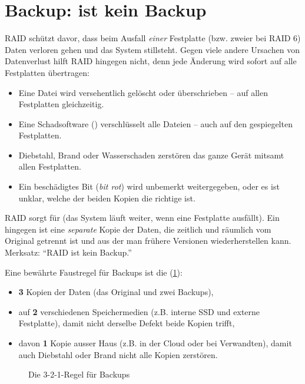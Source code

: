 \section{Backup:  ist kein Backup}\label{sec:backup}

\gls{RAID} schützt davor, dass beim Ausfall \textit{einer} Festplatte (bzw. zweier bei \gls{RAID} 6) Daten verloren gehen und das System stillsteht. Gegen viele andere Ursachen von Datenverlust hilft \gls{RAID} hingegen nicht, denn jede Änderung wird sofort auf alle Festplatten übertragen:
\begin{itemize}
    \item Eine Datei wird versehentlich gelöscht oder überschrieben -- auf allen Festplatten gleichzeitig.
    \item Eine Schadsoftware () verschlüsselt alle Dateien -- auch auf den gespiegelten Festplatten.
    \item Diebstahl, Brand oder Wasserschaden zerstören das ganze Gerät mitsamt allen Festplatten.
    \item Ein beschädigtes Bit (\textit{bit rot}) wird unbemerkt weitergegeben, oder es ist unklar, welche der beiden Kopien die richtige ist.
\end{itemize}

\begin{myremark}
    \gls{RAID} sorgt für  (das System läuft weiter, wenn eine Festplatte ausfällt). Ein  hingegen ist eine \textit{separate} Kopie der Daten, die zeitlich und räumlich vom Original getrennt ist und aus der man frühere Versionen wiederherstellen kann. Merksatz: \enquote{\gls{RAID} ist kein Backup.}
\end{myremark}

Eine bewährte Faustregel für Backups ist die  (\cref{fig:backup321}):
\begin{itemize}
    \item \textbf{3} Kopien der Daten (das Original und zwei Backups),
    \item auf \textbf{2} verschiedenen Speichermedien (z.B. interne SSD und externe Festplatte), damit nicht derselbe Defekt beide Kopien trifft,
    \item davon \textbf{1} Kopie ausser Haus (z.B. in der Cloud oder bei Verwandten), damit auch Diebstahl oder Brand nicht alle Kopien zerstören.
\end{itemize}

\begin{figure}[H]
    \centering
    
    \caption{Die 3-2-1-Regel für Backups}
    \label{fig:backup321}
\end{figure}


